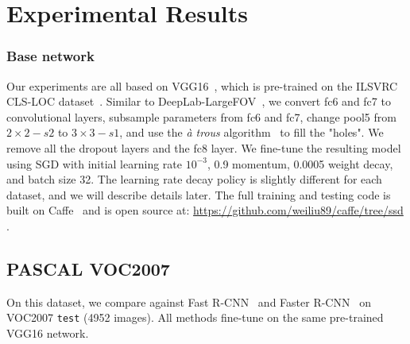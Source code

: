 \documentclass[runningheads]{llncs}
\begin{document}
\section{Experimental Results} \label{sec:exp}
\subsubsection{Base network} Our experiments are all based on VGG16~\cite{simonyan2014very}, which is pre-trained on the ILSVRC CLS-LOC dataset~\cite{russakovsky2014imagenet}. Similar to DeepLab-LargeFOV~\cite{chen2014semantic}, we convert fc6 and fc7 to convolutional layers, subsample parameters from fc6 and fc7, change pool5 from $2\times 2-s2$ to $3\times 3-s1$, and use the \emph{\`{a} trous} algorithm~\cite{holschneider1990real} to fill the "holes". We remove all the dropout layers and the fc8 layer. We fine-tune the resulting model using SGD with initial learning rate $10^{-3}$, 0.9 momentum, 0.0005 weight decay, and batch size 32. The learning rate decay policy is slightly different for each dataset, and we will describe details later. The full training and testing code is built on Caffe~\cite{jia2014caffe} and is open source at: \url{https://github.com/weiliu89/caffe/tree/ssd} .

\subsection{PASCAL VOC2007}
On this dataset, we compare against Fast R-CNN~\cite{girshick2015fast} and Faster R-CNN~\cite{ren2015faster} on VOC2007 \texttt{test} (4952 images). All methods fine-tune on the same pre-trained VGG16 network.
\end{document}
